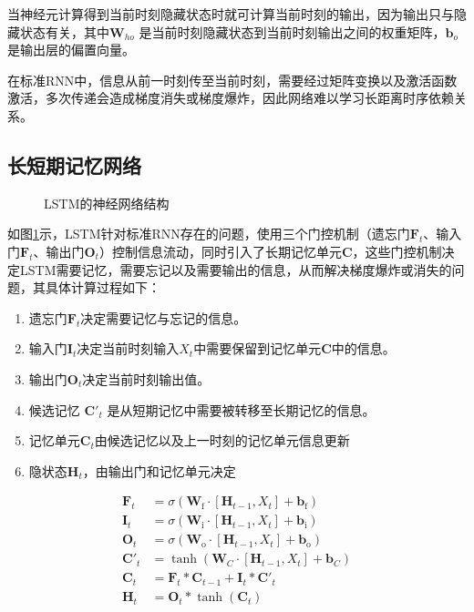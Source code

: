 当神经元计算得到当前时刻隐藏状态时就可计算当前时刻的输出，因为输出只与隐藏状态有关，其中$\mathbf{W}_{ho}$ 是当前时刻隐藏状态到当前时刻输出之间的权重矩阵，$\mathbf{b}_{o}$ 是输出层的偏置向量。

在标准RNN中，信息从前一时刻传至当前时刻，需要经过矩阵变换以及激活函数激活，多次传递会造成梯度消失或梯度爆炸，因此网络难以学习长距离时序依赖关系。

\subsection{长短期记忆网络}

\begin{figure}[hbtp]
    \centering
    
    \caption{LSTM的神经网络结构\cite{zhang2023dive}}
    \label{fig:lstm_struct}
\end{figure}

如图\ref{fig:lstm_struct}示，LSTM针对标准RNN存在的问题，使用三个门控机制（遗忘门$\mathbf{F}_t$、输入门$\mathbf{F}_t$、输出门$\mathbf{O}_t$）控制信息流动，同时引入了长期记忆单元$\mathbf{C}$，这些门控机制决定LSTM需要记忆，需要忘记以及需要输出的信息，从而解决梯度爆炸或消失的问题，其具体计算过程如下：

\begin{enumerate}
    \item 遗忘门$\mathbf{F}_t$决定需要记忆与忘记的信息。
    \item 输入门$\mathbf{I}_t$决定当前时刻输入$X_t$中需要保留到记忆单元$\mathbf{C}$中的信息。
    \item 输出门$\mathbf{O}_t$决定当前时刻输出值。
    \item 候选记忆 $\mathbf{C}'_t$  是从短期记忆中需要被转移至长期记忆的信息。 
    \item 记忆单元$\mathbf{C}_t$由候选记忆以及上一时刻的记忆单元信息更新
    \item 隐状态$\mathbf{H}_t$，由输出门和记忆单元决定
\end{enumerate}

\begin{equation}
\begin{aligned} 
\mathbf{F}_t &= \sigma(\mathbf{W}_{\mathrm{f}} \cdot [\mathbf{H}_{t-1}, X_t] + \mathbf{b}_{\mathrm{f}})\\ 
\mathbf{I}_t &= \sigma(\mathbf{W}_{\mathrm{i}} \cdot [\mathbf{H}_{t-1}, X_t] + \mathbf{b}_{\mathrm{i}})\\ 
\mathbf{O}_t &= \sigma(\mathbf{W}_{\mathrm{o}} \cdot [\mathbf{H}_{t-1}, X_t] + \mathbf{b}_{\mathrm{o}})\\ 
\mathbf{C}'_t &= \tanh(\mathbf{W}_C \cdot [\mathbf{H}_{t-1}, X_t] + \mathbf{b}_C)\\ 
\mathbf{C}_t &= \mathbf{F}_t \ast \mathbf{C}_{t-1} + \mathbf{I}_t \ast \mathbf{C}'_t\\ 
\mathbf{H}_t &= \mathbf{O}_t \ast \tanh(\mathbf{C}_t)\\ 
\end{aligned}
\end{equation}

